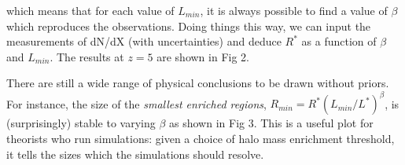 \documentclass[useAMS,usenatbib]{mn2e}
\begin{document}




which means that for each value of $L_{min}$, it is always possible to find a value of $\beta$ which reproduces the observations. Doing things this way, we can input the measurements of dN/dX (with uncertainties) and deduce $R^*$ as a function of $\beta$ and $L_{min}$. The results at $z=5$ are shown in Fig 2.




There are still a wide range of physical conclusions to be drawn without priors. For instance, the size of the \textit{smallest enriched regions}, $R_{min} = R^* (L_{min}/L^*)^\beta$, is (surprisingly) stable to varying $\beta$ as shown in Fig 3. This is a useful plot for theorists who run simulations: given a choice of halo mass enrichment threshold, it tells the sizes which the simulations should resolve.
\end{document}
